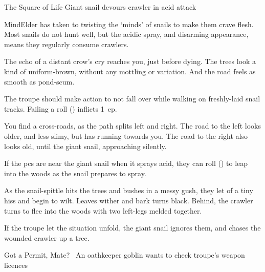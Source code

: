 
{The Square of Life}%
{Giant snail devours \gls{crawler} in acid attack}%

\begin{exampletext}
  \Gls{MindElder} has taken to twisting the `minds' of snails to make them crave flesh.
  Most snails do not hunt well, but the acidic spray, and disarming appearance, means they regularly consume \glspl{crawler}.
\end{exampletext}

\begin{boxtext}
  The echo of a distant crow's cry reaches you, just before dying.
  The trees look a kind of uniform-brown, without any mottling or variation.
  And the road feels as smooth as pond-scum.
\end{boxtext}

The troupe should make  action to not fall over while walking on freshly-laid snail tracks.
Failing a  roll (\tn[7]) inflicts 1~\gls{ep}.

\begin{boxtext}
  You find a cross-roads, as the path splits left and right.
  The road to the left looks older, and less slimy, but has  running towards you.
  The road to the right also looks old, until the giant snail, approaching silently.
\end{boxtext}

If the \glspl{pc} are near the giant snail when it sprays acid, they can roll  (\tn[7]) to leap into the woods as the snail prepares to spray.

\begin{boxtext}
  As the snail-spittle hits the trees and bushes in a messy gush, they let of a tiny hiss and begin to wilt.
  Leaves wither and bark turns black.
  Behind, the \gls{crawler} turns to flee into the woods with two left-legs melded together.
\end{boxtext}

\giantSnail

\chitincrawler

If the troupe let the situation unfold, the giant snail ignores them, and chases the wounded \gls{crawler} up a tree.

{Got a Permit, Mate?}%
{~An oathkeeper goblin wants to check troupe's weapon licences}%

